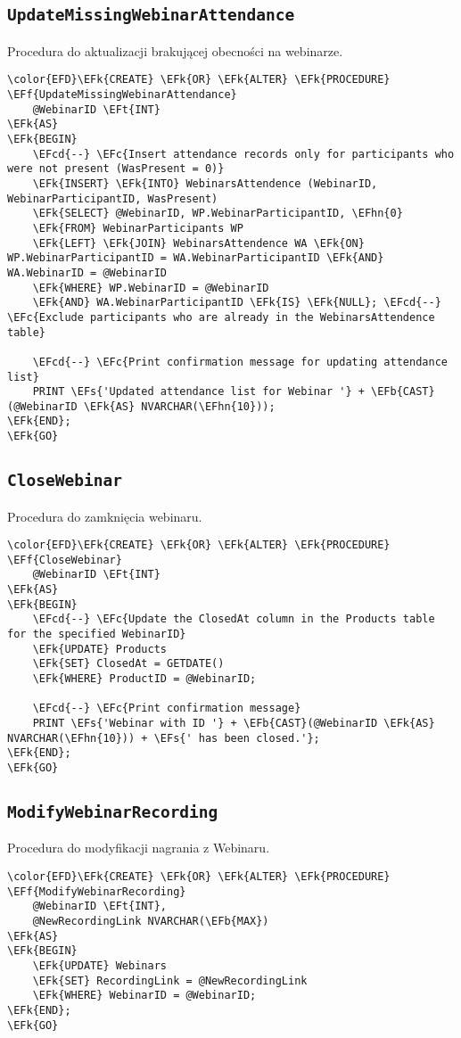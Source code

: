 \documentclass[11pt]{article}
\newcommand{\EFc}[1]{\textcolor{EFc}{\textit{#1}}} %
\newcommand{\EFcd}[1]{\textcolor{EFcd}{\textit{#1}}} %
\newcommand{\EFs}[1]{\textcolor{EFs}{#1}} %
\newcommand{\EFk}[1]{\textcolor{EFk}{\textbf{#1}}} %
\newcommand{\EFb}[1]{\textcolor{EFb}{\textbf{#1}}} %
\newcommand{\EFf}[1]{\textcolor{EFf}{#1}} %
\newcommand{\EFt}[1]{\textcolor{EFt}{\textbf{#1}}} %
\newcommand{\EFhn}[1]{\textcolor{EFhn}{#1}} %
\begin{document}
\subsection{\texttt{UpdateMissingWebinarAttendance}}
\label{sec:orgccb2489}
Procedura do aktualizacji brakującej obecności na webinarze.
\begin{Code}
\begin{Verbatim}
\color{EFD}\EFk{CREATE} \EFk{OR} \EFk{ALTER} \EFk{PROCEDURE} \EFf{UpdateMissingWebinarAttendance}
    @WebinarID \EFt{INT}
\EFk{AS}
\EFk{BEGIN}
    \EFcd{--} \EFc{Insert attendance records only for participants who were not present (WasPresent = 0)}
    \EFk{INSERT} \EFk{INTO} WebinarsAttendence (WebinarID, WebinarParticipantID, WasPresent)
    \EFk{SELECT} @WebinarID, WP.WebinarParticipantID, \EFhn{0}
    \EFk{FROM} WebinarParticipants WP
    \EFk{LEFT} \EFk{JOIN} WebinarsAttendence WA \EFk{ON} WP.WebinarParticipantID = WA.WebinarParticipantID \EFk{AND} WA.WebinarID = @WebinarID
    \EFk{WHERE} WP.WebinarID = @WebinarID
    \EFk{AND} WA.WebinarParticipantID \EFk{IS} \EFk{NULL}; \EFcd{--} \EFc{Exclude participants who are already in the WebinarsAttendence table}

    \EFcd{--} \EFc{Print confirmation message for updating attendance list}
    PRINT \EFs{'Updated attendance list for Webinar '} + \EFb{CAST}(@WebinarID \EFk{AS} NVARCHAR(\EFhn{10}));
\EFk{END};
\EFk{GO}
\end{Verbatim}
\end{Code}
\subsection{\texttt{CloseWebinar}}
\label{sec:org4b51ddd}
Procedura do zamknięcia webinaru.
\begin{Code}
\begin{Verbatim}
\color{EFD}\EFk{CREATE} \EFk{OR} \EFk{ALTER} \EFk{PROCEDURE} \EFf{CloseWebinar}
    @WebinarID \EFt{INT}
\EFk{AS}
\EFk{BEGIN}
    \EFcd{--} \EFc{Update the ClosedAt column in the Products table for the specified WebinarID}
    \EFk{UPDATE} Products
    \EFk{SET} ClosedAt = GETDATE()
    \EFk{WHERE} ProductID = @WebinarID;

    \EFcd{--} \EFc{Print confirmation message}
    PRINT \EFs{'Webinar with ID '} + \EFb{CAST}(@WebinarID \EFk{AS} NVARCHAR(\EFhn{10})) + \EFs{' has been closed.'};
\EFk{END};
\EFk{GO}
\end{Verbatim}
\end{Code}
\subsection{\texttt{ModifyWebinarRecording}}
\label{sec:org7dd30a6}
Procedura do modyfikacji nagrania z Webinaru.
\begin{Code}
\begin{Verbatim}
\color{EFD}\EFk{CREATE} \EFk{OR} \EFk{ALTER} \EFk{PROCEDURE} \EFf{ModifyWebinarRecording}
    @WebinarID \EFt{INT},
    @NewRecordingLink NVARCHAR(\EFb{MAX})
\EFk{AS}
\EFk{BEGIN}
    \EFk{UPDATE} Webinars
    \EFk{SET} RecordingLink = @NewRecordingLink
    \EFk{WHERE} WebinarID = @WebinarID;
\EFk{END};
\EFk{GO}
\end{Verbatim}
\end{Code}
\end{document}

